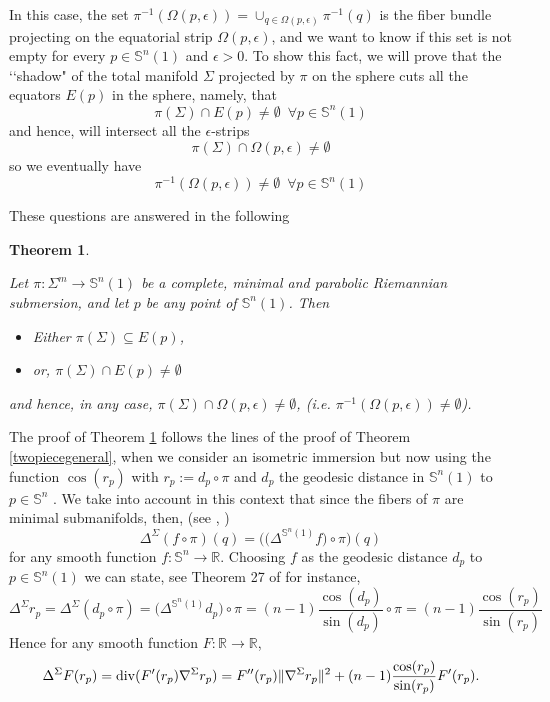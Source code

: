\documentclass{amsart}
\newtheorem{theorem}{Theorem}[section]
\theoremstyle{definition}
\theoremstyle{remark}
\newcommand{\ese}{\mathbb{S}}
\begin{document}
In this case, the set   $\pi^{-1}(\Omega(p,\epsilon))=\cup_{q \in \Omega(p,\epsilon)} \pi^{-1}(q) $ is the fiber bundle projecting on the equatorial strip $ \Omega(p,\epsilon)$, and we want to know if this set is not empty for every $p \in \ese^n(1)$ and $\epsilon >0$. To show this fact, we will prove that the \lq\lq shadow" of the total manifold $\Sigma$ projected by $\pi$ on the sphere cuts all the equators $E(p)$ in the sphere, namely, that
 $$\pi(\Sigma) \cap E(p) \neq \emptyset\,\,\,\forall p \in \mathbb{S}^n(1)$$ and hence, will intersect all the $\epsilon$-strips
        $$\pi(\Sigma) \cap \Omega(p,\epsilon) \neq \emptyset$$
        \noindent so we eventually have  
        $$\pi^{-1}(\Omega(p,\epsilon))\neq \emptyset\,\,\,\forall p \in \mathbb{S}^n(1)$$
   
These questions are answered in the following

\begin{theorem}\label{twopiecegeneralsub}

Let $\pi:\Sigma^m \to \mathbb{S}^n(1)$ be a complete, minimal and parabolic Riemannian submersion, and let $p$ be any point of $\mathbb{S}^n(1)$.  Then
    \begin{itemize}
        \item Either $\pi(\Sigma)\subseteq E(p)$, 
        \item or, $\pi(\Sigma)\cap E(p)\neq \emptyset$
            \end{itemize}
            and  hence, in any case,  $\pi(\Sigma) \cap \Omega(p,\epsilon) \neq \emptyset$, (i.e. $\pi^{-1}(\Omega(p,\epsilon))\neq \emptyset$).
\end{theorem}
The proof of Theorem \ref{twopiecegeneralsub} follows the lines of the proof of Theorem \ref{twopiecegeneral},  when we consider an isometric immersion but now using the function $\cos(r_p)$ with $r_p:=d_p \circ \pi$ and $d_p$ the geodesic distance in $\mathbb{S}^n(1)$ to $p\in \mathbb{S}^n$ . We take into account in this context that since the fibers of $\pi$ are minimal submanifolds, then, (see \cite{W}, \cite{GP})
$$\Delta^\Sigma(f\circ \pi)(q)=\bigg(\big(\Delta^{\ese^n(1)}f\big)\circ\pi\bigg)(q)$$
  for any smooth function $f:\mathbb{S}^n\to \mathbb{R}$. Choosing $f$ as the geodesic distance $d_p$ to $p\in \mathbb{S}^n(1)$ we can state, see Theorem 27 of \cite{Petersen} for instance, 
  $$
  \Delta^\Sigma r_p=\Delta^\Sigma (d_p\circ \pi)=\big(\Delta^{\ese^n(1)}d_p\big)\circ \pi=(n-1)\frac{\cos(d_p)}{\sin(d_p)}\circ \pi=(n-1)\frac{\cos(r_p)}{\sin(r_p)}
  $$
  Hence for any smooth function $F:\mathbb {R}\to \mathbb{R}$,
  $$
\Delta^\Sigma F(r_p)={\rm div }(F'(r_p)\nabla^\Sigma r_p)=F''(r_p)\Vert \nabla^\Sigma r_p\Vert^2+ (n-1)\frac{\cos(r_p)}{\sin(r_p)} F'(r_p).
$$
  
\end{document}
